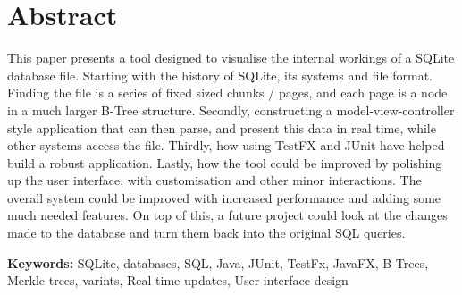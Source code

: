 %
%
%
%
%
%

\section*{\centering Abstract}

This paper presents a tool designed to visualise the internal workings of a SQLite database file. Starting with the history of SQLite, its systems and file format. Finding the file is a series of fixed sized chunks / pages, and each page is a node in a much larger B-Tree structure. Secondly, constructing a model-view-controller style application that can then parse, and present this data in real time, while other systems access the file. Thirdly, how using TestFX and JUnit have helped build a robust application. Lastly, how the tool could be improved by polishing up the user interface, with customisation and other minor interactions. The overall system could be improved with increased performance and adding some much needed features. On top of this, a future project could look at the changes made to the database and turn them back into the original SQL queries. 

\vspace{1.5cm}

\textbf{Keywords:} SQLite, databases, SQL, Java, JUnit, TestFx, JavaFX, B-Trees, Merkle trees, varints, Real time updates, User interface design